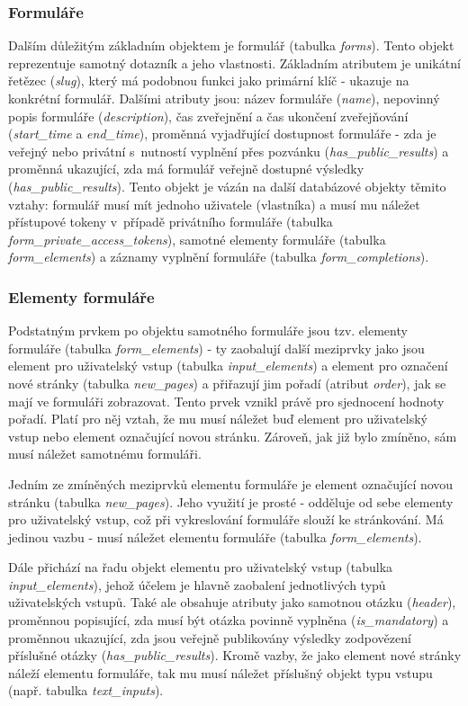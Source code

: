 	\subsubsection{Formuláře}
	Dalším důležitým základním objektem je formulář (tabulka \textit{forms}). Tento objekt reprezentuje samotný dotazník a jeho vlastnosti. Základním atributem je unikátní řetězec (\textit{slug}), který má podobnou funkci jako primární klíč - ukazuje na konkrétní formulář. Dalšími atributy jsou: název formuláře (\textit{name}), nepovinný popis formuláře (\textit{description}), čas zveřejnění a čas ukončení zveřejňování (\textit{start\_time} a \textit{end\_time}), proměnná vyjadřující dostupnost formuláře - zda je veřejný nebo privátní s~nutností vyplnění přes pozvánku (\textit{has\_public\_results}) a proměnná ukazující, zda má formulář veřejně dostupné výsledky (\textit{has\_public\_results}). Tento objekt je vázán na další databázové objekty těmito vztahy: formulář musí mít jednoho uživatele (vlastníka) a musí mu náležet přístupové tokeny v~případě privátního formuláře (tabulka \textit{form\_private\_access\_tokens}), samotné elementy formuláře (tabulka \textit{form\_elements}) a záznamy vyplnění formuláře (tabulka \textit{form\_completions}).
	
	\subsubsection{Elementy formuláře}
	Podstatným prvkem po objektu samotného formuláře jsou tzv. elementy formuláře (tabulka \textit{form\_elements}) - ty zaobalují další meziprvky jako jsou element pro uživatelský vstup (tabulka \textit{input\_elements}) a element pro označení nové stránky (tabulka \textit{new\_pages}) a přiřazují jim pořadí (atribut \textit{order}), jak se mají ve formuláři zobrazovat. Tento prvek vznikl právě pro sjednocení hodnoty pořadí. Platí pro něj vztah, že mu musí náležet buď element pro uživatelský vstup nebo element označující novou stránku. Zároveň, jak již bylo zmíněno, sám musí náležet samotnému formuláři.
	
	Jedním ze zmíněných meziprvků elementu formuláře je element označující novou stránku (tabulka \textit{new\_pages}). Jeho využití je prosté - odděluje od sebe elementy pro uživatelský vstup, což při vykreslování formuláře slouží ke stránkování. Má jedinou vazbu - musí náležet elementu formuláře (tabulka \textit{form\_elements}).
	
	Dále přichází na řadu objekt elementu pro uživatelský vstup (tabulka \textit{input\_elements}), jehož účelem je hlavně zaobalení jednotlivých typů uživatelských vstupů. Také ale obsahuje atributy jako samotnou otázku (\textit{header}), proměnnou popisující, zda musí být otázka povinně vyplněna (\textit{is\_mandatory}) a proměnnou ukazující, zda jsou veřejně publikovány výsledky zodpovězení příslušné otázky (\textit{has\_public\_results}). Kromě vazby, že jako element nové stránky náleží elementu formuláře, tak mu musí náležet příslušný objekt typu vstupu (např. tabulka \textit{text\_inputs}).
	
